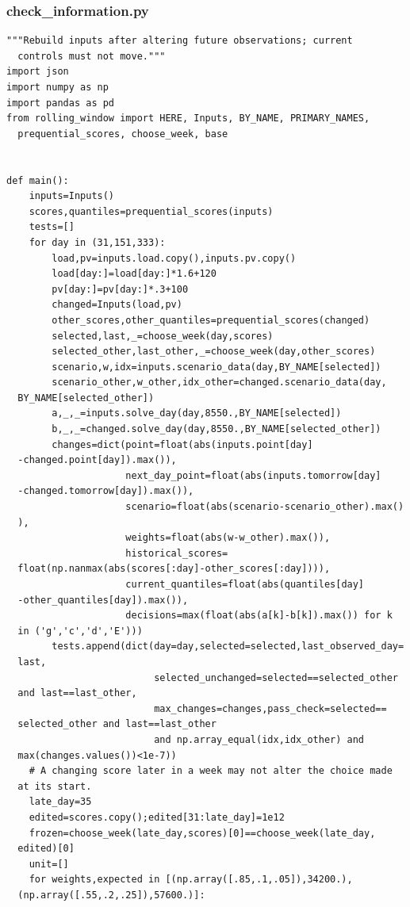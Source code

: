 \subsubsection*{check\_information.py}
\begin{verbatim}
"""Rebuild inputs after altering future observations; current
  controls must not move."""
import json
import numpy as np
import pandas as pd
from rolling_window import HERE, Inputs, BY_NAME, PRIMARY_NAMES,
  prequential_scores, choose_week, base


def main():
    inputs=Inputs()
    scores,quantiles=prequential_scores(inputs)
    tests=[]
    for day in (31,151,333):
        load,pv=inputs.load.copy(),inputs.pv.copy()
        load[day:]=load[day:]*1.6+120
        pv[day:]=pv[day:]*.3+100
        changed=Inputs(load,pv)
        other_scores,other_quantiles=prequential_scores(changed)
        selected,last,_=choose_week(day,scores)
        selected_other,last_other,_=choose_week(day,other_scores)
        scenario,w,idx=inputs.scenario_data(day,BY_NAME[selected])
        scenario_other,w_other,idx_other=changed.scenario_data(day,
  BY_NAME[selected_other])
        a,_,_=inputs.solve_day(day,8550.,BY_NAME[selected])
        b,_,_=changed.solve_day(day,8550.,BY_NAME[selected_other])
        changes=dict(point=float(abs(inputs.point[day]
  -changed.point[day]).max()),
                     next_day_point=float(abs(inputs.tomorrow[day]
  -changed.tomorrow[day]).max()),
                     scenario=float(abs(scenario-scenario_other).max()
  ),
                     weights=float(abs(w-w_other).max()),
                     historical_scores=
  float(np.nanmax(abs(scores[:day]-other_scores[:day]))),
                     current_quantiles=float(abs(quantiles[day]
  -other_quantiles[day]).max()),
                     decisions=max(float(abs(a[k]-b[k]).max()) for k
  in ('g','c','d','E')))
        tests.append(dict(day=day,selected=selected,last_observed_day=
  last,
                          selected_unchanged=selected==selected_other
  and last==last_other,
                          max_changes=changes,pass_check=selected==
  selected_other and last==last_other
                          and np.array_equal(idx,idx_other) and
  max(changes.values())<1e-7))
    # A changing score later in a week may not alter the choice made
  at its start.
    late_day=35
    edited=scores.copy();edited[31:late_day]=1e12
    frozen=choose_week(late_day,scores)[0]==choose_week(late_day,
  edited)[0]
    unit=[]
    for weights,expected in [(np.array([.85,.1,.05]),34200.),
  (np.array([.55,.2,.25]),57600.)]:

\end{verbatim}
